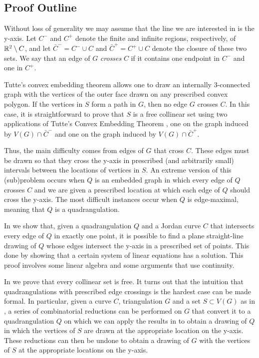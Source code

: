 \documentclass{patmorin}
\begin{document}
\subsection{Proof Outline}

Without loss of generality we may assume that the line we are interested
in is the y-axis.  Let $C^-$ and $C^+$ denote the finite and infinite
regions, respectively, of $\mathbb{R}^2\setminus C$, and let $\bar{C}^-=C^-\cup C$
and $\bar{C}^+=C^+\cup C$ denote the closure of these two sets.  We say
that an edge of $G$ \emph{crosses} $C$ if it contains one endpoint in
$C^-$ and one in $C^+$.

Tutte's convex embedding theorem \cite{tutte:how} allows one to draw an
internally 3-connected graph with the vertices of the outer face drawn
on any prescribed convex polygon.  If the vertices in $S$ form a path in
$G$, then no edge $G$ crosses $C$. In this case, it is straightforward to
prove that $S$ is a free collinear set using two applications of Tutte's
Convex Embedding Theorem \cite{tutte:how}, one on the graph induced by
$V(G)\cap\bar{C}^-$ and one on the graph induced by $V(G)\cap \bar{C}^+$.

Thus, the main difficulty comes from edges of $G$ that cross $C$.
These edges must be drawn so that they cross the y-axis in prescribed
(and arbitrarily small) intervals between the locations of vertices
in $S$.  An extreme version of this (sub)problem occurs when $Q$ is an
embedded graph in which every edge of $Q$ crosses $C$ and we are given a
prescribed location at which each edge of $Q$ should cross the y-axis.
The most difficult instances occur when $Q$ is edge-maximal, meaning
that $Q$ is a quadrangulation.

In  we show that, given a quadrangulation $Q$
and a Jordan curve $C$ that intersects every edge of $Q$ in exactly one
point, it is possible to find a plane straight-line drawing of $Q$ whose
edges intersect the y-axis in a prescribed set of points.  This done by
showing that a certain system of linear equations has a solution. This
proof involves some linear algebra and some arguments that use continuity.

In  we prove that every collinear set is free.
It turns out that the intuition that quadrangulations with prescribed
edge crossings is the hardest case can be made formal. In particular,
given a curve $C$, triangulation $G$ and a set $S\subset V(G)$ as in
, a series of combinatorial reductions can be
performed on $G$ that convert it to a quadrangulation $Q$ on which we can
apply the results in  to obtain a drawing of $Q$
in which the vertices of $S$ are drawn at the appropriate location on the
y-axis. These reductions can then be undone to obtain a drawing of $G$
with the vertices of $S$ at the appropriate locations on the y-axis.
\end{document}
